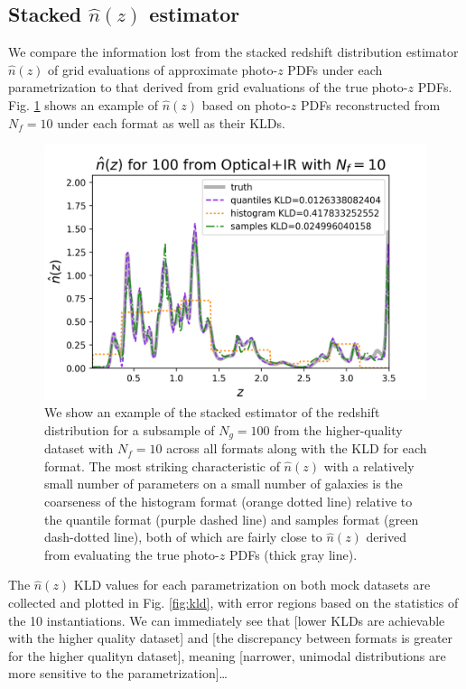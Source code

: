\documentclass[\docopts]{\docclass}
\newcommand{\pz}{photo-$z$ PDF}
\begin{document}
\subsection{Stacked $\hat{n}(z)$ estimator}
\label{sec:stacked_results}

We compare the information lost from the stacked redshift distribution 
estimator $\hat{n}(z)$ of grid evaluations of approximate \pz s under each 
parametrization to that derived from grid evaluations of the true \pz s.  Fig. 
\ref{fig:stacked} shows an example of $\hat{n}(z)$ based on \pz s reconstructed 
from $N_{f}=10$ under each format as well as their KLDs.

\begin{figure}
  \includegraphics[width=0.9\columnwidth]{figures/euclid_stacked.png}
  \caption{We show an example of the stacked estimator of the redshift 
distribution for a subsample of $N_{g}=100$ from the higher-quality dataset 
with $N_{f}=10$ across all formats along with the KLD for each format.  The 
most striking characteristic of $\hat{n}(z)$ with a relatively small number of 
parameters on a small number of galaxies is the coarseness of the histogram 
format (orange dotted line) relative to the quantile format (purple dashed 
line) and samples format (green dash-dotted line), both of which are fairly 
close to $\hat{n}(z)$ derived from evaluating the true \pz s (thick gray line).
  \label{fig:stacked}}
\end{figure}

The $\hat{n}(z)$ KLD values for each parametrization on both mock datasets are 
collected and plotted in Fig. \ref{fig:kld}, with error regions based on the 
statistics of the 10 instantiations.  We can immediately see that [lower KLDs 
are achievable with the higher quality dataset] and [the discrepancy between 
formats is greater for the higher qualityn dataset], meaning [narrower, 
unimodal distributions are more sensitive to the parametrization]\dots
\end{document}
